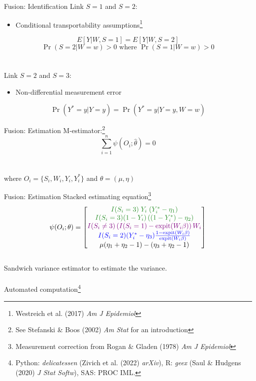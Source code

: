 \documentclass{beamer}
\newcommand{\blue}[1]{\textcolor{blue}{#1}}
\newcommand{\violet}[1]{\textcolor{violet}{#1}}
\newcommand{\green}[1]{\textcolor{ForestGreen}{#1}}
\begin{document}
\begin{frame}{Fusion: Identification}
	Link $S=1$ and $S=2$:
	\begin{itemize}
		\item Conditional transportability assumptions\footnote[frame]{Westreich et al. (2017) \textit{Am J Epidemiol}}
	\end{itemize}
	$$E[Y | W, S=1] = E[Y | W, S=2]$$
	$$\Pr(S=2 | W=w) > 0 \text{ where } \Pr(S=1 | W=w) > 0$$
	~\\~\\
	Link $S=2$ and $S=3$:
	\begin{itemize}
		\item Non-differential measurement error
	\end{itemize}
	$$\Pr(Y^*=y|Y=y) = \Pr(Y^*=y|Y=y,W=w)$$
\end{frame}

\begin{frame}{Fusion: Estimation}
	M-estimator:\footnote[frame]{See Stefanski \& Boos (2002) \textit{Am Stat} for an introduction}~\\
	\[\sum_{i=1}^{n} \psi(O_i; \hat{\theta}) = 0\]~\\~\\
	where $O_i = \{S_i, W_i, Y_i, Y_i^*\}$ and $\theta = (\mu, \eta)$
\end{frame}

\begin{frame}{Fusion: Estimation}
	Stacked estimating equation\footnote[frame]{Measurement correction from Rogan \& Gladen (1978) \textit{Am J Epidemiol}}
	$$ \psi(O_i; \theta) =
	\left[
	\begin{matrix}
		\green{I(S_i=3) \; Y_i \; (Y_i^* - \eta_1)} \\		
		\green{I(S_i=3) (1 - Y_i) \left((1-Y_i^*) - \eta_2\right)}\\
		\violet{I(S_i \ne 3) \left(I(S_i=1) - \text{expit}(W_i \beta)\right)W_i}\\
		\blue{I(S_i = 2) (Y_i^* - \eta_3) \frac{1 - \text{expit}(W_i \beta)}{\text{expit}(W_i \beta)}}\\
		\mu (\eta_1 + \eta_2 - 1) - (\eta_3 + \eta_2 - 1)
	\end{matrix}
	\right]
	$$~\\
	Sandwich variance estimator to estimate the variance.\\~\\
	Automated computation\footnote[frame]{Python: \textit{delicatessen} (Zivich et al. (2022) \textit{arXiv}), R: \textit{geex} (Saul \& Hudgens (2020) \textit{J Stat Softw}), SAS: PROC IML.}
\end{frame}
\end{document}
